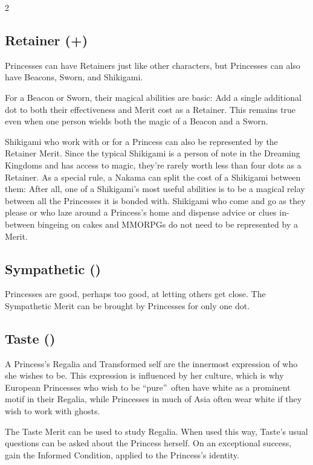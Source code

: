 \begin{multicols}{2}
\subsection*{Retainer (\textbullet+)}

Princesses can have Retainers just like other characters, but Princesses can also have Beacons, Sworn, and Shikigami. 

For a Beacon or Sworn, their magical abilities are basic: Add a single additional dot to both their effectiveness and Merit cost as a Retainer. This remains true even when one person wields both the magic of a Beacon and a Sworn. 

Shikigami who work with or for a Princess can also be represented by the Retainer Merit. Since the typical Shikigami is a person of note in the Dreaming Kingdoms and has access to magic, they're rarely worth less than four dots as a Retainer. As a special rule, a Nakama can split the cost of a Shikigami between them: After all, one of a Shikigami's most useful abilities is to be a magical relay between all the Princesses it is bonded with. Shikigami who come and go as they please or who laze around a Princess's home and dispense advice or clues in-between bingeing on cakes and MMORPGs do not need to be represented by a Merit. 

\subsection*{Sympathetic (\textbullet)}

Princesses are good, perhaps too good, at letting others get close. The Sympathetic Merit can be brought by Princesses for only one dot. 

\subsection*{Taste (\textbullet)}

A Princess's Regalia and Transformed self are the innermost expression of who she wishes to be. This expression is influenced by her culture, which is why European Princesses who wish to be \textquotedblleft pure\textquotedblright\, often have white as a prominent motif in their Regalia, while Princesses in much of Asia often wear white if they wish to work with ghosts. 

The Taste Merit can be used to study Regalia. When used this way, Taste's usual questions can be asked about the Princess herself. On an exceptional success, gain the Informed Condition, applied to the Princess's identity. 


\end{multicols}
